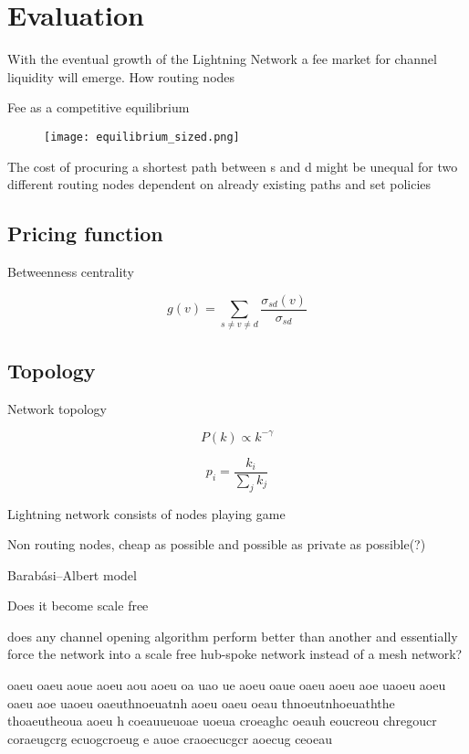 \chapter{Evaluation}

With the eventual growth of the Lightning Network a fee market for channel liquidity will emerge. How routing nodes 


Fee as a competitive equilibrium 



\begin{figure}[!htb]
	\hspace*{-0.7cm} 
	\centering
	\texttt{[image: equilibrium\_sized.png]}
	\caption{ 
		}
		\label{fig:equilibrium}
		\hspace*{2mm} 	
\end{figure}



The cost of procuring a shortest path between s and d might be unequal for two different routing nodes dependent on already existing paths and set policies

\section{Pricing function}

Betweenness centrality

\[ g(v) = \sum_{s \neq v \neq d}\frac{\sigma_{sd}(v)}{\sigma_{sd}} \]

\section{Topology}

Network topology

\[ P(k) \propto k^{-\gamma} \]

\[ p_i = \dfrac{k_i}{\sum_{j}^{}k_j}  \]


Lightning network consists of nodes playing game

Non routing nodes, cheap as possible and possible as private as possible(?) 

Barabási–Albert model

Does it become scale free

does any channel opening algorithm perform better than another and essentially force the network into a scale free hub-spoke network instead of a mesh network?


oaeu
oaeu
aoue
aoeu
aou
aoeu
oa
uao
ue
aoeu
oaue
oaeu
aoeu
aoe
uaoeu aoeu oaeu aoe uaoeu oaeuthnoeuatnh 
aoeu oaeu oeau thnoeutnhoeuaththe thoaeutheoua 
aoeu h
coeauueuoae uoeua croeaghc oeauh eoucreou chregoucr 
coraeugcrg ecuogcroeug e auoe craoecucgcr aoecug ceoeau 




